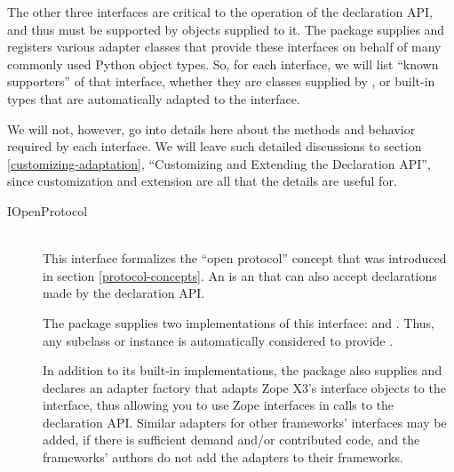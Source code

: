 \begin{verbatim%
}
\begin{verbatim%
}
\begin{verbatim%
}
\begin{verbatim%
}
\begin{description}
\end{description}

The other three interfaces are critical to the operation of the declaration API,
and thus must be supported by objects supplied to it.  The 
package supplies and registers various adapter classes that provide these
interfaces on behalf of many commonly used Python object types.  So, for each
interface, we will list ``known supporters'' of that interface, whether they
are classes supplied by , or built-in types that are
automatically adapted to the interface.

We will not, however, go into details here about the methods and behavior
required by each interface.  We will leave such detailed discussions to
section \ref{customizing-adaptation}, ``Customizing and Extending the
Declaration API'', since customization and extension are all that the
details are useful for.

\begin{description}



\item[IOpenProtocol] \hfill \\
This interface formalizes the ``open protocol'' concept that was introduced
in section \ref{protocol-concepts}.  An  is an
 that can also accept declarations made by the
 declaration API.

The  package supplies two implementations of this interface:
 and .  Thus, any 
subclass or  instance is automatically considered to provide
.  

In addition to its built-in implementations, the  package
also supplies and declares an adapter factory that adapts Zope X3's
interface objects to the  interface, thus allowing
you to use Zope interfaces in calls to the declaration API.  Similar adapters
for other frameworks' interfaces may be added, if there is sufficient demand
and/or contributed code, and the frameworks' authors do not add the adapters
to their frameworks.



\end{description}
\end{verbatim%
}
\end{verbatim%
}
\end{verbatim%
}
\end{verbatim%
}
